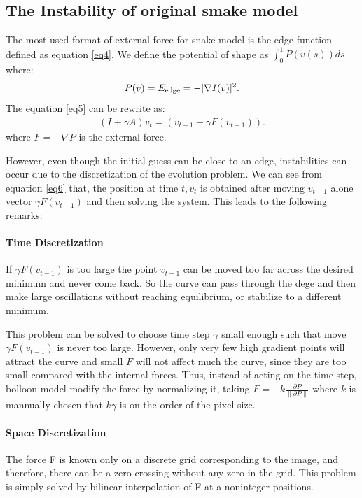\documentclass[journal]{IEEEtran}
\begin{document}
\subsection{The Instability of original smake model}
The most used format of external force for snake model is the edge function defined as equation \ref{eq4}. We define the potential of shape as $\int_0^1 P(v(s))ds$ where:
\begin{equation}\begin{aligned}
P(v)=E_{\text{edge}}=-|\nabla I(v)|^2.\notag
\end{aligned}\end{equation}
The equation \ref{eq5} can be rewrite as:
\begin{equation}\begin{aligned}
(I+\gamma A)v_t=(v_{t-1}+\gamma F(v_{t-1})).\label{eq6}
\end{aligned}\end{equation}
where $F=-\nabla P$ is the external force.

However, even though the initial guess can be close to an edge, instabilities can occur due to the discretization of the evolution problem. We can see from equation \ref{eq6} that, the position at time $t, v_t$ is obtained after moving $v_{t-1}$ alone vector $\gamma F(v_{t-1})$ and then solving the system. This leads to the following remarks:
\paragraph{Time Discretization} If $\gamma F(v_{t-1})$ is too large the point $v_{t-1}$ can be moved too far across the desired minimum and never come back. So the curve can pass through the dege and then make large oscillations without reaching equilibrium, or stabilize to a different minimum.

This problem can be solved to choose time step $\gamma$ small enough such that move $\gamma F(v_{t-1})$ is never too large. However, only very few high gradient points will attract the curve and small $F$ will not affect much the curve, since they are too small compared with the internal forces. Thus, instead of acting on the time step, bolloon model modify the force by normalizing it, taking $F=-k\frac{\partial P}{\|\partial P\|}$ where $k$ is mannually chosen that $k\gamma$ is on the order of the pixel size.

\paragraph{Space Discretization}The force F is known only on a discrete grid corresponding to the image, and therefore, there can be a zero-crossing without any zero in the grid. This problem is simply solved by bilinear interpolation of F at a noninteger positions.
\end{document}
